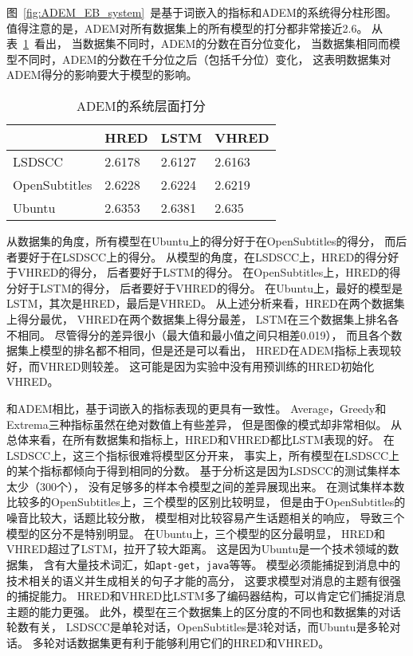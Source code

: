 图~\ref{fig:ADEM_EB_system}~是基于词嵌入的指标和ADEM的系统得分柱形图。 值得注意的是，ADEM对所有数据集上的所有模型的打分都非常接近2.6。 从表~\ref{tab:ADEM_system}~看出， 当数据集不同时，ADEM的分数在百分位变化， 当数据集相同而模型不同时，ADEM的分数在千分位之后（包括千分位）变化， 这表明数据集对ADEM得分的影响要大于模型的影响。
\begin{table}
    \centering
    \caption{ADEM的系统层面打分}
    \label{tab:ADEM_system}
    \begin{tabular}{llll}
        \toprule
        & HRED & LSTM & VHRED \\
        \midrule
        LSDSCC & 2.6178 & 2.6127 & 2.6163  \\
        OpenSubtitles & 2.6228 & 2.6224 & 2.6219 \\
        Ubuntu & 2.6353 & 2.6381 & 2.635 \\
        \bottomrule
    \end{tabular}
\end{table}
从数据集的角度，所有模型在Ubuntu上的得分好于在OpenSubtitles的得分， 而后者要好于在LSDSCC上的得分。 从模型的角度，在LSDSCC上，HRED的得分好于VHRED的得分， 后者要好于LSTM的得分。 在OpenSubtitles上，HRED的得分好于LSTM的得分， 后者要好于VHRED的得分。 在Ubuntu上，最好的模型是LSTM，其次是HRED，最后是VHRED。 从上述分析来看，HRED在两个数据集上得分最优， VHRED在两个数据集上得分最差， LSTM在三个数据集上排名各不相同。 尽管得分的差异很小（最大值和最小值之间只相差0.019）， 而且各个数据集上模型的排名都不相同，但是还是可以看出， HRED在ADEM指标上表现较好，而VHRED则较差。 这可能是因为实验中没有用预训练的HRED初始化VHRED。


和ADEM相比，基于词嵌入的指标表现的更具有一致性。 Average，Greedy和Extrema三种指标虽然在绝对数值上有些差异， 但是图像的模式却非常相似。 从总体来看，在所有数据集和指标上，HRED和VHRED都比LSTM表现的好。 在LSDSCC上，这三个指标很难将模型区分开来， 事实上，所有模型在LSDSCC上的某个指标都倾向于得到相同的分数。 基于分析这是因为LSDSCC的测试集样本太少（300个）， 没有足够多的样本令模型之间的差异展现出来。 在测试集样本数比较多的OpenSubtitles上，三个模型的区别比较明显， 但是由于OpenSubtitles的噪音比较大，话题比较分散， 模型相对比较容易产生话题相关的响应， 导致三个模型的区分不是特别明显。 在Ubuntu上，三个模型的区分最明显， HRED和VHRED超过了LSTM，拉开了较大距离。 这是因为Ubuntu是一个技术领域的数据集， 含有大量技术词汇，如\texttt{apt-get}，\texttt{java}等等。 模型必须能捕捉到消息中的技术相关的语义并生成相关的句子才能的高分， 这要求模型对消息的主题有很强的捕捉能力。 HRED和VHRED比LSTM多了编码器结构，可以肯定它们捕捉消息主题的能力更强。 此外，模型在三个数据集上的区分度的不同也和数据集的对话轮数有关， LSDSCC是单轮对话，OpenSubtitles是3轮对话，而Ubuntu是多轮对话。 多轮对话数据集更有利于能够利用它们的HRED和VHRED。

